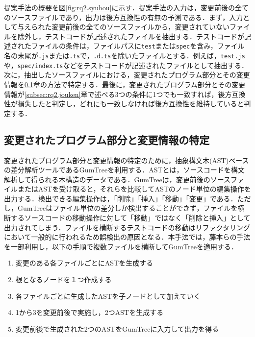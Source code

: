 \documentclass[11pt,dvipdfmx]{jreport}
\begin{document}
提案手法の概要を図\ref{fig:rq2.syuhou}に示す．提案手法の入力は，変更前後の全てのソースファイルであり，出力は後方互換性の有無の予測である．まず，入力として与えられた変更前後の全てのソースファイルから，変更されていないファイルを除外し，テストコードが記述されたファイルを抽出する．テストコードが記述されたファイルの条件は，ファイルパスに{\verb|test|}または{\verb|spec|}を含み，ファイル名の末尾が{\verb|.js|}または{\verb|.ts|}で，{\verb|.d.ts|}を除いたファイルとする．例えば，{\verb|test.js|}や，{\verb|spec/index.ts|}などをテストコードが記述されたファイルとして抽出する．次に，抽出したソースファイルにおける，変更されたプログラム部分とその変更情報を\ref{subsec:rq2.astseisei}章の方法で特定する．最後に，変更されたプログラム部分とその変更情報が\ref{subsec:rq2.jouken}章で述べる3つの条件に1つでも一致すれば，後方互換性が損失したと判定し，どれにも一致しなければ後方互換性を維持していると判定する．

\subsection{変更されたプログラム部分と変更情報の特定}\label{subsec:rq2.astseisei}
変更されたプログラム部分と変更情報の特定のために，抽象構文木(AST)ベースの差分解析ツールであるGumTree\cite{gumtree}を利用する．ASTとは，ソースコードを構文解析して得られる木構造のデータである．GumTreeは，変更前後のソースファイルまたはASTを受け取ると，それらを比較してASTのノード単位の編集操作を出力する．検出できる編集操作は，「削除」「挿入」「移動」「変更」である．ただし，GumTreeはファイル単位の差分しか検出することができず，ファイルを横断するソースコードの移動操作に対して「移動」ではなく「削除と挿入」として出力されてしまう．ファイルを横断するテストコードの移動はリファクタリングにおいて一般的に行われるため誤検出の原因となる．本手法では，藤本らの手法\cite{gumtreenoyatu}を一部利用し，以下の手順で複数ファイルを横断してGumTreeを適用する．

\begin{enumerate}
  \setlength{\itemsep}{0cm}
  \item 変更のある各ファイルごとにASTを生成する
  \item 根となるノードを１つ作成する
  \item 各ファイルごとに生成したASTを子ノードとして加えていく
  \item 1から3を変更前後で実施し，2つASTを生成する
  \item 変更前後で生成された2つのASTをGumTreeに入力して出力を得る
\end{enumerate}
\end{document}
